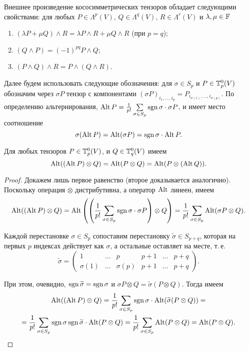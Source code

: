 \begin{theorem}
    Внешнее произведение кососимметрических тензоров обладает следующими свойствами: для любых $P \in \Lambda^p(V)$, $Q \in \Lambda^q(V)$, $R \in \Lambda^r(V)$ и $\lambda, \mu \in \mathbb{F}$
    \begin{enumerate}[nolistsep]
        \item $(\lambda P + \mu Q) \wedge R = \lambda P \wedge R + \mu Q \wedge R$ (при $p = q$);
        \item $(Q \wedge P) = (-1)^{pq}P \wedge Q$;
        \item $(P \wedge Q) \wedge R = P \wedge (Q \wedge R)$.
    \end{enumerate}
\end{theorem}

Далее будем использовать следующие обозначения: для $\sigma \in S_p$ и $P \in \mathbb{T}_p^0(V)$ обозначим через $\sigma P$ тензор с компонентами $(\sigma P)_{i_1, \ldots, i_p} = P_{i_{\sigma(1)}, \ldots, i_{\sigma(p)}}$. По определению альтернирования, $\operatorname{Alt} P = \frac{1}{p!}\sum\limits_{\sigma \in S_p}\operatorname{sgn}\sigma \cdot \sigma P$, и имеет место соотношение
\[
    \sigma(\operatorname{Alt} P) = \operatorname{Alt}(\sigma P) = \operatorname{sgn}\sigma \cdot \operatorname{Alt} P.
\]

\begin{lemma}
    Для любых тензоров $P \in \mathbb{T}_p^0(V)$, и $Q \in \mathbb{T}_q^0(V)$ имеем
    \[
        \operatorname{Alt}((\operatorname{Alt} P) \otimes Q) = \operatorname{Alt}(P \otimes Q) = \operatorname{Alt}(P \otimes (\operatorname{Alt} Q)).
    \]
\end{lemma}

\begin{proof}
    Докажем лишь первое равенство (второе доказывается аналогично). Поскольку операция $\otimes$ дистрибутивна, а оператор $\operatorname{Alt}$ линеен, имеем
    \[
        \operatorname{Alt}((\operatorname{Alt} P) \otimes Q) = \operatorname{Alt}\left(\left(\frac{1}{p!}\sum_{\sigma \in S_p}\operatorname{sgn}\sigma \cdot \sigma P\right) \otimes Q\right) = \frac{1}{p!}\sum_{\sigma \in S_p}\operatorname{Alt}(\sigma P \otimes Q).
    \]

    Каждой перестановке $\sigma \in S_p$ сопоставим перестановку $\widetilde{\sigma} \in S_{p + q}$, которая на первых $p$ индексах действует как $\sigma$, а остальные оставляет на месте, т.\,е.
    \[
        \widetilde{\sigma} =
        \begin{pmatrix}
            1 & \ldots & p & p + 1 & \ldots & p + q\\
            \sigma(1) & \ldots & \sigma(p) & p + 1 & \ldots & p + q
        \end{pmatrix}.
    \]

    При этом, очевидно, $\operatorname{sgn}\widetilde{\sigma} = \operatorname{sgn}\sigma$ и $\sigma P \otimes Q = \widetilde{\sigma}(P \otimes Q)$. Тогда имеем
    \begin{multline*}
        \operatorname{Alt}((\operatorname{Alt} P) \otimes Q) = \frac{1}{p!}\sum_{\sigma \in S_p}\operatorname{sgn}\sigma \cdot \operatorname{Alt}(\widetilde{\sigma}(P \otimes Q)) =\\ = \frac{1}{p!}\sum_{\sigma \in S_p}\operatorname{sgn}\sigma\operatorname{sgn}\widetilde{\sigma} \cdot \operatorname{Alt}(P \otimes Q) = \frac{1}{p!}\sum_{\sigma \in S_p}\operatorname{Alt}(P \otimes Q) = \operatorname{Alt}(P \otimes Q).
    \end{multline*}
\end{proof}


